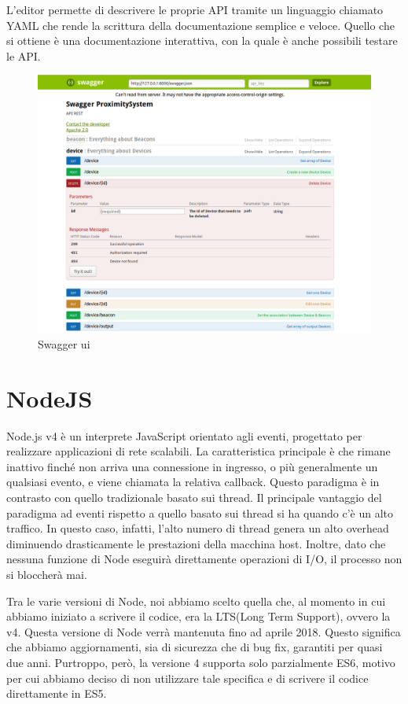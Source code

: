 L'editor permette di descrivere le proprie API tramite un linguaggio chiamato YAML
che rende la scrittura della documentazione semplice e veloce.
Quello che si ottiene è una documentazione interattiva, con la quale è anche possibili testare le API. 
\begin{figure}[htbp]
\centering
\includegraphics[scale=0.333]{Immagini/swagger-ui.png}
\caption{Swagger ui} 
\end{figure}

\newpage
\section{NodeJS}
Node.js\cite{node} v4 è un interprete JavaScript orientato agli eventi, progettato per realizzare applicazioni di rete scalabili.
La caratteristica principale è che rimane inattivo finché non arriva una connessione in ingresso, o più generalmente un qualsiasi evento, e viene chiamata la relativa callback.
Questo paradigma è in contrasto con quello tradizionale basato sui thread.
Il principale vantaggio del paradigma ad eventi rispetto a quello basato sui thread si ha quando c'è un alto traffico.
In questo caso, infatti, l'alto numero di thread genera un alto overhead diminuendo drasticamente le prestazioni della macchina host.
Inoltre, dato che nessuna funzione di Node eseguirà direttamente operazioni di I/O, il processo non si bloccherà mai.

Tra le varie versioni di Node, noi abbiamo scelto quella che, al momento in cui abbiamo iniziato a scrivere il codice, era la LTS(Long Term Support), ovvero la v4.
Questa versione di Node verrà mantenuta fino ad aprile 2018.
Questo significa che abbiamo aggiornamenti, sia di sicurezza che di bug fix, garantiti per quasi due anni.
Purtroppo, però, la versione 4 supporta solo parzialmente ES6, motivo per cui abbiamo deciso di non utilizzare tale specifica e di scrivere il codice direttamente in ES5. 


